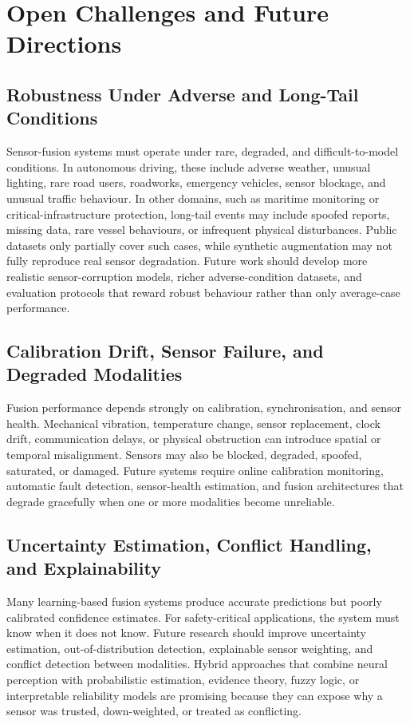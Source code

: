 \documentclass{ieeeaccess}
\begin{document}
\section{Open Challenges and Future Directions}
\label{sec:open-challenges}

\subsection{Robustness Under Adverse and Long-Tail Conditions}

Sensor-fusion systems must operate under rare, degraded, and difficult-to-model conditions. In autonomous driving, these include adverse weather, unusual lighting, rare road users, roadworks, emergency vehicles, sensor blockage, and unusual traffic behaviour. In other domains, such as maritime monitoring or critical-infrastructure protection, long-tail events may include spoofed reports, missing data, rare vessel behaviours, or infrequent physical disturbances. Public datasets only partially cover such cases, while synthetic augmentation may not fully reproduce real sensor degradation. Future work should develop more realistic sensor-corruption models, richer adverse-condition datasets, and evaluation protocols that reward robust behaviour rather than only average-case performance.

\subsection{Calibration Drift, Sensor Failure, and Degraded Modalities}

Fusion performance depends strongly on calibration, synchronisation, and sensor health. Mechanical vibration, temperature change, sensor replacement, clock drift, communication delays, or physical obstruction can introduce spatial or temporal misalignment. Sensors may also be blocked, degraded, spoofed, saturated, or damaged. Future systems require online calibration monitoring, automatic fault detection, sensor-health estimation, and fusion architectures that degrade gracefully when one or more modalities become unreliable.

\subsection{Uncertainty Estimation, Conflict Handling, and Explainability}

Many learning-based fusion systems produce accurate predictions but poorly calibrated confidence estimates. For safety-critical applications, the system must know when it does not know. Future research should improve uncertainty estimation, out-of-distribution detection, explainable sensor weighting, and conflict detection between modalities. Hybrid approaches that combine neural perception with probabilistic estimation, evidence theory, fuzzy logic, or interpretable reliability models are promising because they can expose why a sensor was trusted, down-weighted, or treated as conflicting.
\end{document}
